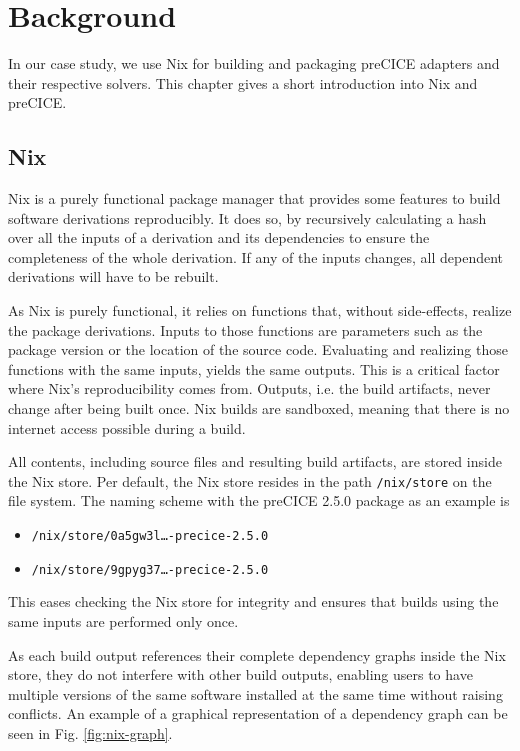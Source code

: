 \documentclass{eceasst}
\begin{document}
\section{Background}

In our case study, we use Nix for building and packaging preCICE adapters and their respective solvers.
This chapter gives a short introduction into Nix and preCICE.

\subsection{Nix}

Nix is a purely functional package manager that provides some features to build software derivations reproducibly.
It does so, by recursively calculating a hash over all the inputs of a derivation and its dependencies to ensure the completeness of the whole derivation.
If any of the inputs changes, all dependent derivations will have to be rebuilt.

As Nix is purely functional, it relies on functions that, without side-effects, realize the package derivations.
Inputs to those functions are parameters such as the package version or the location of the source code.
Evaluating and realizing those functions with the same inputs, yields the same outputs.
This is a critical factor where Nix's reproducibility comes from.
Outputs, i.e. the build artifacts, never change after being built once.
Nix builds are sandboxed, meaning that there is no internet access possible during a build.

All contents, including source files and resulting build artifacts, are stored inside the Nix store.
Per default, the Nix store resides in the path \texttt{/nix/store} on the file system.
The naming scheme with the preCICE 2.5.0 package as an example is

\begin{itemize}
  \item \texttt{/nix/store/0a5gw3l\ldots-precice-2.5.0}
  \item \texttt{/nix/store/9gpyg37\ldots-precice-2.5.0}
\end{itemize}

This eases checking the Nix store for integrity and ensures that builds using the same inputs are performed only once.

As each build output references their complete dependency graphs inside the Nix store, they do not interfere with other build outputs, enabling users to have multiple versions of the same software installed at the same time without raising conflicts.
An example of a graphical representation of a dependency graph can be seen in Fig. \ref{fig:nix-graph}.
\end{document}
